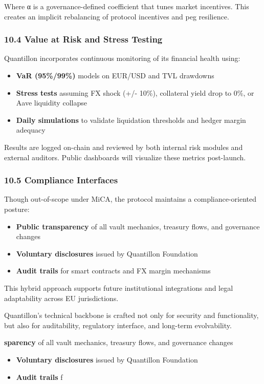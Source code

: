 Where α is a governance-defined coefficient that tunes market
incentives. This creates an implicit rebalancing of protocol incentives
and peg resilience.

\hypertarget{value-at-risk-and-stress-testing}{%
\subsubsection{10.4 Value at Risk and Stress
Testing}\label{value-at-risk-and-stress-testing}}

Quantillon incorporates continuous monitoring of its financial health
using:

\begin{itemize}
\item
  \textbf{VaR (95\%/99\%)} models on EUR/USD and TVL drawdowns
\item
  \textbf{Stress tests} assuming FX shock (+/- 10\%), collateral yield
  drop to 0\%, or Aave liquidity collapse
\item
  \textbf{Daily simulations} to validate liquidation thresholds and
  hedger margin adequacy
\end{itemize}

Results are logged on-chain and reviewed by both internal risk modules
and external auditors. Public dashboards will visualize these metrics
post-launch.

\hypertarget{compliance-interfaces}{%
\subsubsection{10.5 Compliance Interfaces}\label{compliance-interfaces}}

Though out-of-scope under MiCA, the protocol maintains a
compliance-oriented posture:

\begin{itemize}
\item
  \textbf{Public transparency} of all vault mechanics, treasury flows,
  and governance changes
\item
  \textbf{Voluntary disclosures} issued by Quantillon Foundation
\item
  \textbf{Audit trails} for smart contracts and FX margin mechanisms
\end{itemize}

This hybrid approach supports future institutional integrations and
legal adaptability across EU jurisdictions.

Quantillon's technical backbone is crafted not only for security and
functionality, but also for auditability, regulatory interface, and
long-term evolvability.

\textbf{sparency} of all vault mechanics, treasury flows, and governance
changes

\begin{itemize}
\item
  \textbf{Voluntary disclosures} issued by Quantillon Foundation
\item
  \textbf{Audit trails} f
\end{itemize}
